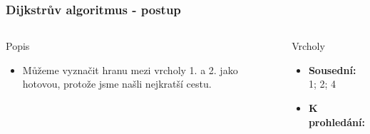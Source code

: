 \documentclass{beamer}
\begin{document}
\begin{frame}
    \frametitle{Dijkstrův algoritmus - postup}
    \begin{columns}
        \begin{block}{Popis}
            \begin{itemize}
                \item Můžeme vyznačit hranu mezi vrcholy 1. a 2. jako hotovou, protože jsme našli nejkratší cestu.
            \end{itemize}
        \end{block}
        \begin{block}{Vrcholy}
            \begin{itemize}
                \item \textbf{Sousední:} 1; 2; 4 
                \item \textbf{K prohledání:} 
            \end{itemize}
        \end{block}
    \end{columns}
\end{frame}
\end{document}
